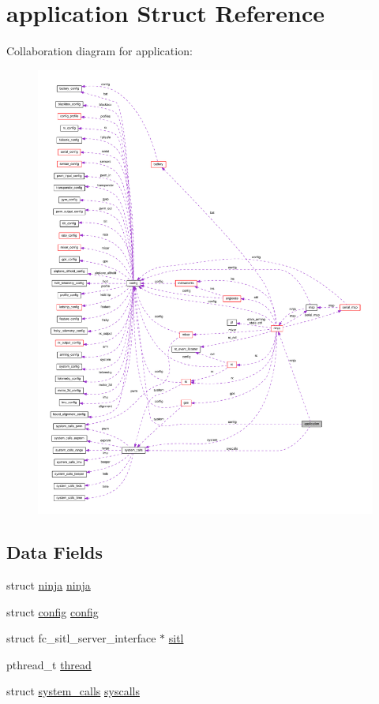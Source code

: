 \hypertarget{structapplication}{\section{application Struct Reference}
\label{structapplication}
}


Collaboration diagram for application\+:\nopagebreak
\begin{figure}[H]
\begin{center}
\leavevmode
\includegraphics[width=350pt]{structapplication__coll__graph}
\end{center}
\end{figure}
\subsection*{Data Fields}
\begin{DoxyCompactItemize}
\item 
struct \hyperlink{structninja}{ninja} \hyperlink{structapplication_a729df3310ba2feba49de72a3d005e860}{ninja}
\item 
struct \hyperlink{structconfig}{config} \hyperlink{structapplication_a1993bc26ad93ec593f701680a41001cf}{config}
\item 
struct fc\+\_\+sitl\+\_\+server\+\_\+interface $\ast$ \hyperlink{structapplication_ad8b0003626c6b8e8bae39970f990172d}{sitl}
\item 
pthread\+\_\+t \hyperlink{structapplication_acc8e09a998f76d4deb214f38a3fc2ce6}{thread}
\item 
struct \hyperlink{structsystem__calls}{system\+\_\+calls} \hyperlink{structapplication_a9f2d1076ba777fa64a770d72d5c0b80b}{syscalls}
\end{DoxyCompactItemize}


